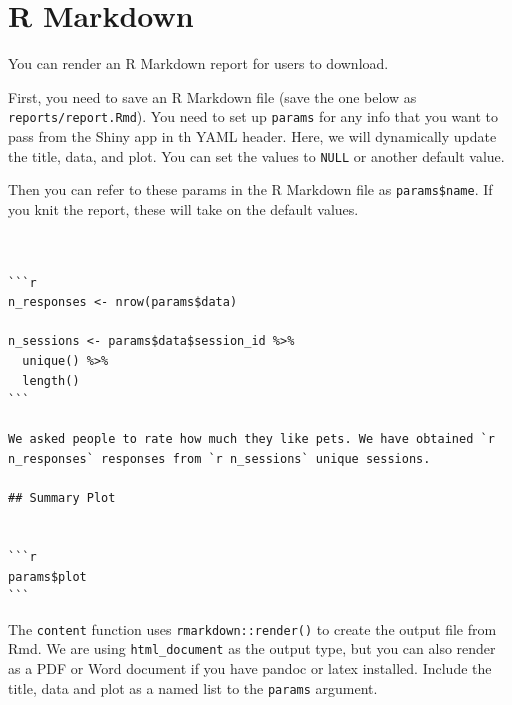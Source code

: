 \documentclass[
]{book}
\newenvironment{Shaded}{\begin{snugshade}}{\end{snugshade}}
\newcommand{\AttributeTok}[1]{\textcolor[rgb]{0.77,0.63,0.00}{#1}}
\newcommand{\CharTok}[1]{\textcolor[rgb]{0.31,0.60,0.02}{#1}}
\newcommand{\FunctionTok}[1]{\textcolor[rgb]{0.00,0.00,0.00}{#1}}
\newcommand{\KeywordTok}[1]{\textcolor[rgb]{0.13,0.29,0.53}{\textbf{#1}}}
\newcommand{\PreprocessorTok}[1]{\textcolor[rgb]{0.56,0.35,0.01}{\textit{#1}}}
\newcommand{\StringTok}[1]{\textcolor[rgb]{0.31,0.60,0.02}{#1}}
\begin{document}
\hypertarget{r-markdown}{%
\section{R Markdown}\label{r-markdown}}

You can render an R Markdown report for users to download.

First, you need to save an R Markdown file (save the one below as \texttt{reports/report.Rmd}). You need to set up \texttt{params} for any info that you want to pass from the Shiny app in th YAML header. Here, we will dynamically update the title, data, and plot. You can set the values to \texttt{NULL} or another default value.

\begin{Shaded}
\end{Shaded}

Then you can refer to these params in the R Markdown file as \texttt{params\$name}. If you knit the report, these will take on the default values.

\begin{verbatim}


```r
n_responses <- nrow(params$data)

n_sessions <- params$data$session_id %>%
  unique() %>%
  length()
```

We asked people to rate how much they like pets. We have obtained `r n_responses` responses from `r n_sessions` unique sessions.

## Summary Plot


```r
params$plot
```
\end{verbatim}

The \texttt{content} function uses \texttt{rmarkdown::render()} to create the output file from Rmd. We are using \texttt{html\_document} as the output type, but you can also render as a PDF or Word document if you have pandoc or latex installed. Include the title, data and plot as a named list to the \texttt{params} argument.
\end{document}

